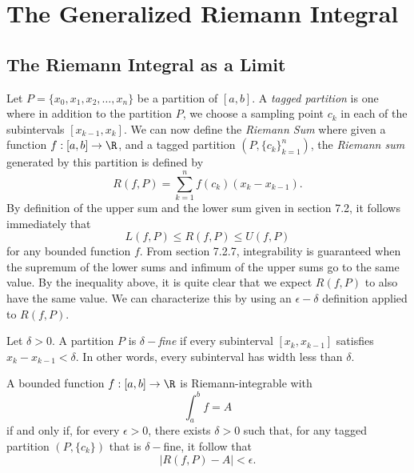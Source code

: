 \section{The Generalized Riemann Integral}

\subsection{The Riemann Integral as a Limit}

Let \( P = \{ x_{0}, x_{1}, x_{2}, \dots, x_{n} \}  \) be a partition of \( [a,b]  \). A \textit{tagged partition} is one where in addition to the partition \( P \), we choose a sampling point \( c_{k }  \) in each of the subintervals \( [x_{k-1}, x_{k }]  \). We can now define the \textit{Riemann Sum} where given a function \( f: [a,b] \to \R  \), and a tagged partition \( (P , \{ c_{k }  \} _{k=1}^{n}  ) \), the \textit{Riemann sum} generated by this partition is defined by 
\[  R(f,P ) = \sum_{ k=1 }^{ n } f(c_{k }) (x_{k } - x_{k-1}). \]
By definition of the upper sum and the lower sum given in section 7.2, it follows immediately that 
\[  L(f,P) \leq R(f,P) \leq U(f,P)   \] for any bounded function \( f  \). From section 7.2.7, integrability is guaranteed when the supremum of the lower sums and infimum of the upper sums go to the same value. By the inequality above, it is quite clear that we expect \( R(f,P ) \) to also have the same value. We can characterize this by using an \( \epsilon - \delta   \) definition applied to \( R(f,P)  \).
\begin{tcolorbox}
\begin{defn}
    Let \( \delta > 0   \). A partition \( P  \) is \( \delta- \)\textit{fine} if every subinterval \( [x_{k }, x_{k-1} ]  \) satisfies \( x_{k } - x_{k-1} <  \delta  \). In other words, every subinterval has width less than \( \delta  \).
\end{defn}
\end{tcolorbox}

\begin{tcolorbox}
    \begin{thm}
    A bounded function \( f: [a,b] \to \R  \) is Riemann-integrable with 
    \[  \int_{ a }^{ b } f  = A  \] if and only if, for every \( \epsilon > 0 \), there exists \( \delta > 0  \) such that, for any tagged partition \( (P, \{ c_{k } \} ) \) that is \( \delta- \)fine, it follow that 
    \[  | R(f,P) - A  | < \epsilon. \]
    \end{thm}
\end{tcolorbox}

